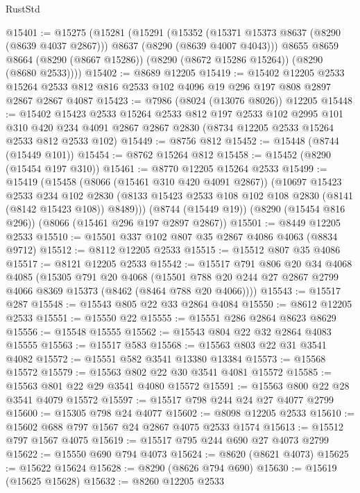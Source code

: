\begin{lexlean}{RustStd}
\begin{coremodule}
@15401 := @15275
    (@15281
      (@15291
        (@15352 (@15371 @15373 @8637 (@8290 (@8639 @4037 @2867))) @8637 (@8290 (@8639 @4007 @4043)))
        @8655
        @8659
        @8664
        (@8290 (@8667 @15286))
        (@8290 (@8672 @15286 @15264))
        (@8290 (@8680 @2533))))
@15402 := @8689 @12205
@15419 := @15402
    @12205
    @2533
    @15264
    @2533
    @812
    @816
    @2533
    @102
    @4096
    @19
    @296
    @197
    @808
    @2897
    @2867
    @2867
    @4087
@15423 := @7986 (@8024 (@13076 @8026)) @12205
@15448 := @15402
    @15423
    @2533
    @15264
    @2533
    @812
    @197
    @2533
    @102
    @2995
    @101
    @310
    @420
    @234
    @4091
    @2867
    @2867
    @2830
    (@8734 @12205 @2533 @15264 @2533 @812 @2533 @102)
@15449 := @8756 @812
@15452 := @15448 (@8744 (@15449 @101))
@15454 := @8762 @15264 @812
@15458 := @15452 (@8290 (@15454 @197 @310))
@15461 := @8770 @12205 @15264 @2533
@15499 := @15419
    (@15458
      (@8066 (@15461 @310 @420 @4091 @2867))
      (@10697
        @15423
        @2533
        @234
        @102
        @2830
        (@8133 @15423 @2533 @108 @102 @108 @2830 (@8141 (@8142 @15423 @108)) @8489)))
    (@8744 (@15449 @19))
    (@8290 (@15454 @816 @296))
    (@8066 (@15461 @296 @197 @2897 @2867))
@15501 := @8449 @12205 @2533
@15510 := @15501 @337 @102 @807 @35 @2867 @4086 @4063 (@8834 @9712)
@15512 := @8112 @12205 @2533
@15515 := @15512 @807 @35 @4086
@15517 := @8121 @12205 @2533
@15542 := @15517
    @791
    @806
    @20
    @34
    @4068
    @4085
    (@15305
      @791
      @20
      @4068
      (@15501 @788 @20 @244 @27 @2867 @2799 @4066 @8369 @15373 (@8462 (@8464 @788 @20 @4066))))
@15543 := @15517 @287
@15548 := @15543 @805 @22 @33 @2864 @4084
@15550 := @8612 @12205 @2533
@15551 := @15550 @22
@15555 := @15551 @286 @2864 @8623 @8629
@15556 := @15548 @15555
@15562 := @15543 @804 @22 @32 @2864 @4083 @15555
@15563 := @15517 @583
@15568 := @15563 @803 @22 @31 @3541 @4082
@15572 := @15551 @582 @3541 @13380 @13384
@15573 := @15568 @15572
@15579 := @15563 @802 @22 @30 @3541 @4081 @15572
@15585 := @15563 @801 @22 @29 @3541 @4080 @15572
@15591 := @15563 @800 @22 @28 @3541 @4079 @15572
@15597 := @15517 @798 @244 @24 @27 @4077 @2799
@15600 := @15305 @798 @24 @4077
@15602 := @8098 @12205 @2533
@15610 := @15602 @688 @797 @1567 @24 @2867 @4075 @2533 @1574
@15613 := @15512 @797 @1567 @4075
@15619 := @15517 @795 @244 @690 @27 @4073 @2799
@15622 := @15550 @690 @794 @4073
@15624 := @8620 (@8621 @4073)
@15625 := @15622 @15624
@15628 := @8290 (@8626 @794 @690)
@15630 := @15619 (@15625 @15628)
@15632 := @8260 @12205 @2533

\end{coremodule}
\end{lexlean}
